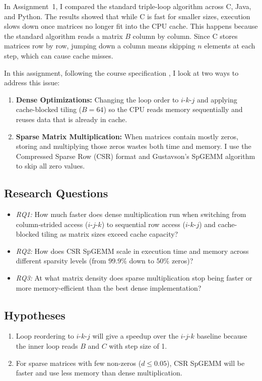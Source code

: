 \documentclass[10pt,conference,a4paper]{IEEEtran}
\begin{document}
In Assignment~1, I compared the standard triple-loop algorithm across C, Java, and Python. 
The results showed that while C is fast for smaller sizes, execution slows down once matrices no longer fit into the CPU cache. 
This happens because the standard algorithm reads a matrix $B$ column by column. 
Since C stores matrices row by row, jumping down a column means skipping $n$ elements at each step, which can cause cache misses.

In this assignment, following the course specification \cite{ulpgc2026, bigdataweb}, I look at two ways to address this issue:
\begin{enumerate}
    \item \textbf{Dense Optimizations:} Changing the loop order to $i\text{-}k\text{-}j$ and applying cache-blocked tiling ($B=64$) so the CPU reads memory sequentially and reuses data that is already in cache.
    \item \textbf{Sparse Matrix Multiplication:} When matrices contain mostly zeros, storing and multiplying those zeros wastes both time and memory. I use the Compressed Sparse Row (CSR) format and Gustavson's SpGEMM algorithm to skip all zero values.
\end{enumerate}

\subsection{Research Questions}
\begin{itemize}
    \item \textit{RQ1:} How much faster does dense multiplication run when switching from column-strided access ($i\text{-}j\text{-}k$) to sequential row access ($i\text{-}k\text{-}j$) and cache-blocked tiling as matrix sizes exceed cache capacity?
    \item \textit{RQ2:} How does CSR SpGEMM scale in execution time and memory across different sparsity levels (from $99.9\%$ down to $50\%$ zeros)?
    \item \textit{RQ3:} At what matrix density does sparse multiplication stop being faster or more memory-efficient than the best dense implementation?
\end{itemize}

\subsection{Hypotheses}
\begin{enumerate}
    \item Loop reordering to $i\text{-}k\text{-}j$ will give a speedup over the $i\text{-}j\text{-}k$ baseline because the inner loop reads $B$ and $C$ with step size of 1.
    \item For sparse matrices with few non-zeros ($d \le 0.05$), CSR SpGEMM will be faster and use less memory than dense multiplication.
\end{enumerate}
\end{document}
